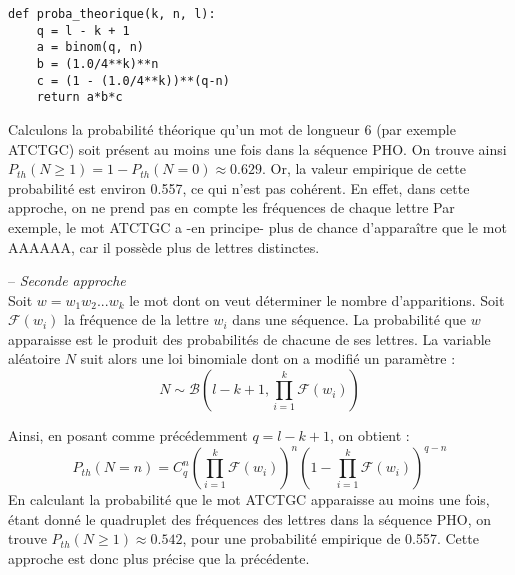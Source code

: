 \documentclass[11pt]{article}
\begin{document}
\begin{lstlisting}
def proba_theorique(k, n, l):
    q = l - k + 1
    a = binom(q, n)
    b = (1.0/4**k)**n
    c = (1 - (1.0/4**k))**(q-n)
    return a*b*c
\end{lstlisting}

Calculons la probabilité théorique qu'un mot de longueur 6 (par exemple {\ttfamily ATCTGC}) soit présent au moins une fois dans la séquence PHO. On trouve ainsi $P_{th} (N \geq 1) = 1 - P_{th}(N = 0) \approx 0.629$. Or, la valeur empirique de cette probabilité est environ 0.557, ce qui n'est pas cohérent.
En effet, dans cette approche, on ne prend pas en compte les fréquences de chaque lettre Par exemple, le mot {\ttfamily ATCTGC} a -en principe- plus de chance d'apparaître que le mot {\ttfamily AAAAAA}, car il possède plus de lettres distinctes. 

-- {\itshape Seconde approche} \\
 Soit $w = w_1 w_2 ... w_k$ le mot dont on veut déterminer le nombre d'apparitions. Soit $\mathcal{F}(w_i)$ la fréquence de la lettre $w_i$ dans une séquence. La probabilité que $w$ apparaisse est le produit des probabilités de chacune de ses lettres. La variable aléatoire $N$ suit alors une loi binomiale dont on a modifié un paramètre :
\[N \sim \mathcal{B}(l - k + 1, \prod_{i = 1}^{k} \mathcal{F} (w_i) )\]

Ainsi, en posant comme précédemment $q = l - k + 1$, on obtient :
\[P_{th}(N = n) = C^{n}_q \left(\prod_{i = 1}^{k} \mathcal{F} (w_i) \right)^n \left(1 - \prod_{i = 1}^{k} \mathcal{F} (w_i) \right)^{q - n}\]
En calculant la probabilité que le mot {\ttfamily ATCTGC} apparaisse au moins une fois, étant donné le quadruplet des fréquences des lettres dans la séquence PHO, on trouve  $P_{th} (N \geq 1) \approx 0.542$, pour une probabilité empirique de 0.557. Cette approche est donc plus précise que la précédente.
\end{document}
